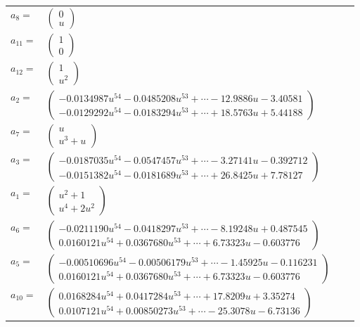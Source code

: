 \documentclass[1p]{elsarticle_modified}
\theoremstyle{definition}
\begin{document}
\begin{tabular}{m{7pt} m{180pt} m{7pt} m{180pt} }
\flushright $a_{8}=$&$\begin{pmatrix}0\\u\end{pmatrix}$ \\
\flushright $a_{11}=$&$\begin{pmatrix}1\\0\end{pmatrix}$ \\
\flushright $a_{12}=$&$\begin{pmatrix}1\\u^2\end{pmatrix}$ \\
\flushright $a_{2}=$&$\begin{pmatrix}-0.0134987 u^{54}-0.0485208 u^{53}+\cdots-12.9886 u-3.40581\\-0.0129292 u^{54}-0.0183294 u^{53}+\cdots+18.5763 u+5.44188\end{pmatrix}$ \\
\flushright $a_{7}=$&$\begin{pmatrix}u\\u^3+u\end{pmatrix}$ \\
\flushright $a_{3}=$&$\begin{pmatrix}-0.0187035 u^{54}-0.0547457 u^{53}+\cdots-3.27141 u-0.392712\\-0.0151382 u^{54}-0.0181689 u^{53}+\cdots+26.8425 u+7.78127\end{pmatrix}$ \\
\flushright $a_{1}=$&$\begin{pmatrix}u^2+1\\u^4+2 u^2\end{pmatrix}$ \\
\flushright $a_{6}=$&$\begin{pmatrix}-0.0211190 u^{54}-0.0418297 u^{53}+\cdots-8.19248 u+0.487545\\0.0160121 u^{54}+0.0367680 u^{53}+\cdots+6.73323 u-0.603776\end{pmatrix}$ \\
\flushright $a_{5}=$&$\begin{pmatrix}-0.00510696 u^{54}-0.00506179 u^{53}+\cdots-1.45925 u-0.116231\\0.0160121 u^{54}+0.0367680 u^{53}+\cdots+6.73323 u-0.603776\end{pmatrix}$ \\
\flushright $a_{10}=$&$\begin{pmatrix}0.0168284 u^{54}+0.0417284 u^{53}+\cdots+17.8209 u+3.35274\\0.0107121 u^{54}+0.00850273 u^{53}+\cdots-25.3078 u-6.73136\end{pmatrix}$ \\

\end{tabular}
\end{document}
